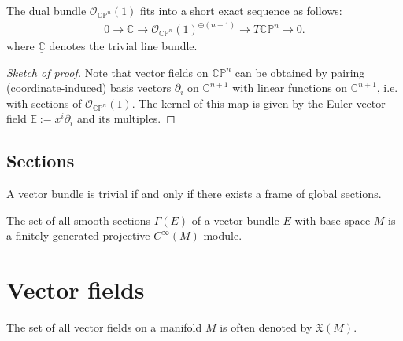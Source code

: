     \begin{property}
        The dual bundle $\mathcal{O}_{\mathbb{CP}^n}(1)$ fits into a short exact sequence as follows:
        \begin{gather}
            0\longrightarrow\underline{\mathbb{C}}\longrightarrow\mathcal{O}_{\mathbb{CP}^n}(1)^{\oplus(n+1)}\longrightarrow T\mathbb{CP}^n\longrightarrow0.
        \end{gather}
        where $\underline{\mathbb{C}}$ denotes the trivial line bundle.
        \begin{proof}[Sketch of proof]
            Note that vector fields on $\mathbb{CP}^n$ can be obtained by pairing (coordinate-induced) basis vectors $\partial_i$ on $\mathbb{C}^{n+1}$ with linear functions on $\mathbb{C}^{n+1}$, i.e. with sections of $\mathcal{O}_{\mathbb{CP}^n}(1)$. The kernel of this map is given by the Euler vector field $\mathbb{E}:=x^i\partial_i$ and its multiples.
        \end{proof}
    \end{property}

\subsection{Sections}

    \begin{property}\label{diff:prop:trivial_vector_bundle}
        A vector bundle is trivial if and only if there exists a frame of global sections.
    \end{property}

    \begin{theorem}\label{diff:serre_swan}
        The set of all smooth sections $\Gamma(E)$ of a vector bundle $E$ with base space $M$ is a finitely-generated projective $C^\infty(M)$-module.
    \end{theorem}

\section{Vector fields}

    \begin{notation}
        The set of all vector fields on a manifold $M$ is often denoted by $\mathfrak{X}(M)$.
    \end{notation}

